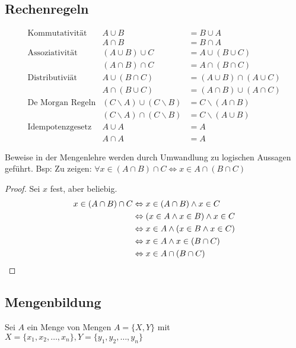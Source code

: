 \subsection{Rechenregeln}
\settowidth{\MyLenA}{Doppelte Negation~~}
\begin{equation*}
\begin{array}{lrl}
	\mbox{Kommutativität}		& A \cup B 									& = B \cup A\\
								& A \cap B									& = B \cap A\\
	\mbox{Assoziativität} 		& (A \cup B) \cup C 						& = A \cup (B \cup C)\\
								& (A \cap B) \cap C 						& = A \cap (B \cap C)\\
	\mbox{Distributiviät}		& A \cup (B \cap C) 						& = (A \cup B) \cap (A \cup C)\\
								& A \cap (B \cup C) 						& = (A \cap B) \cup (A \cap C)\\
	\mbox{De Morgan Regeln}		& (C \backslash A) \cup (C \backslash B) 	& = C \backslash (A \cap B)\\
								& (C \backslash A) \cap (C \backslash B) 	& = C \backslash (A \cup B)\\
	\mbox{Idempotenzgesetz}		& A \cup A 									& = A\\
								& A \cap A									& = A
\end{array}
\end{equation*}

Beweise in der Mengenlehre werden durch Umwandlung zu logischen Aussagen geführt.
Bsp: Zu zeigen: $\forall x \in (A \cap B) \cap C \Leftrightarrow x \in A \cap (B \cap C)$
\begin{proof}
Sei $x$ fest, aber beliebig.
\begin{align*}
	x \in (A \cap B) \cap C	& \Leftrightarrow x \in (A \cap B) \wedge x \in C\\
							& \Leftrightarrow (x \in A \wedge x \in B) \wedge x \in C\\
							& \Leftrightarrow x \in A \wedge (x \in B \wedge x \in C)\\
							& \Leftrightarrow x \in A \wedge x \in (B \cap C)\\
							& \Leftrightarrow x \in A \cap (B \cap C)\qedhere
\end{align*}
\end{proof}

\subsection{Mengenbildung}
Sei $A$ ein Menge von Mengen $A = \{X, Y\}$ mit $X = \{x_1, x_2, \dots, x_n\}, Y = \{y_1, y_2, \dots, y_n\}$\\

